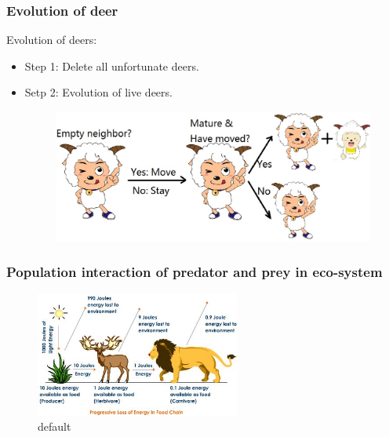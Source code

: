 \documentclass{beamer}
\begin{document}
\frame
{
  	\frametitle{Evolution of deer}
  	Evolution of deers: \\
 	\begin{itemize}
  	\item<1->{Step 1: Delete all unfortunate deers.}
  	\item<2->{Setp 2: Evolution of live deers.
 
  	\begin{figure}[htbp]
 	 \begin{center}
  	\includegraphics[width=\textwidth]{./pics/goat.jpeg}
  	\label{default}
 	 \end{center}
  	\end{figure}
  	}
   	\end{itemize}
}
\frame
{
	\frametitle{Population interaction of predator and prey in eco-system}

	\begin{figure}[htbp]
	\begin{center}
	\includegraphics[width=0.6\textwidth]{./pics/progressive-energy-loss.jpeg}
	\caption{default}
	\label{default}
	\end{center}
	\end{figure}
}
\end{document}
